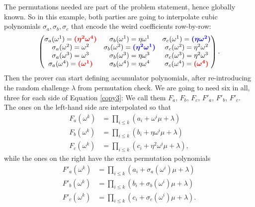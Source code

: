 The permutations needed are part of the problem statement, hence
globally known. So in this example, both parties are going to
interpolate cubic polynomials \(\sigma_{a},\sigma_{b},\sigma_{c}\) that
encode the weird coefficients row-by-row: 
\[
\begin{pmatrix}
\sigma_{a}( \omega^{1} ) = \textcolor{red}{\boldsymbol{({\eta^{2}\omega^{4}})}} & \sigma_{b}( \omega^{1} ) = \eta\omega^{1} & \sigma_{c}( \omega^{1} ) = \textcolor{blue}{\boldsymbol{({\eta\omega^{2}})}} \\
\sigma_{a}( \omega^{2} ) = \omega^{2} & \sigma_{b}( \omega^{2} ) = \textcolor{blue}{\boldsymbol{({\eta^{2}\omega^{1}})}} & \sigma_{c}( \omega^{2} ) = \eta^{2}\omega^{2} \\
\sigma_{a}( \omega^{3} ) = \omega^{3} & \sigma_{b}( \omega^{3} ) = \eta\omega^{3} & \sigma_{c}( \omega^{3} ) = \eta^{2}\omega^{3} \\
\sigma_{a}( \omega^{4} ) = \textcolor{red}{\boldsymbol{(\omega^{1})}} & \sigma_{b}( \omega^{4} ) = \eta\omega^{4} & \sigma_{c}( \omega^{4} ) = \textcolor{red}{\boldsymbol{(\omega^{4})}}
\end{pmatrix}.
\] 
Then the prover can start defining accumulator
polynomials, after re-introducing the random challenge \(\lambda\) from
permutation check. We are going to need six in all, three for each side
of Equation \eqref{copy3}: We call them \(F_{a}\), \(F_{b}\),
\(F_{c}\), \(F'_{a}\), \(F'_{b}\), \(F'_{c}\). The ones on the left-hand
side are interpolated so that
\begin{equation}
\label{copycheck-left}
\begin{aligned}
F_{a}( \omega^{k} ) & = \prod_{i \leq k}( a_{i} + \omega^{i}\mu + \lambda ) \\
F_{b}( \omega^{k} ) & = \prod_{i \leq k}( b_{i} + \eta\omega^{i}\mu + \lambda ) \\
F_{c}( \omega^{k} ) & = \prod_{i \leq k}( c_{i} + \eta^{2}\omega^{i}\mu + \lambda ),
\end{aligned}
\end{equation}
while the ones on the right have the extra permutation polynomials
\begin{equation}
\label{copycheck-right}
\begin{aligned}
F'_{a}( \omega^{k} ) & = \prod_{i \leq k}( a_{i} + \sigma_{a}( \omega^{i} )\mu + \lambda ) \\
F'_{b}( \omega^{k} ) & = \prod_{i \leq k}( b_{i} + \sigma_{b}( \omega^{i} )\mu + \lambda ) \\
F'_{c}( \omega^{k} ) & = \prod_{i \leq k}( c_{i} + \sigma_{c}( \omega^{i} )\mu + \lambda ).
\end{aligned}
\end{equation}

